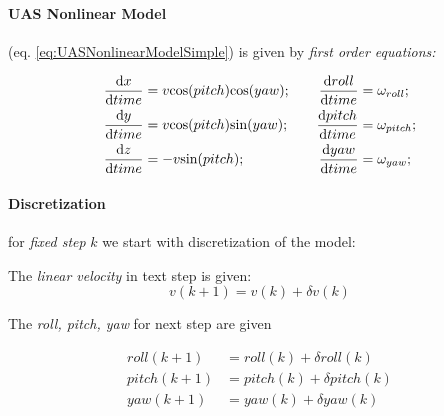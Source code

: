 \paragraph{UAS Nonlinear Model} (eq. \ref{eq:UASNonlinearModelSimple}) is given by \emph{first order equations:}

\begin{equation}\label{eq:UASNonlinearModelSimple}
    \begin{aligned}
        \frac{\text{d} x}{\text{d} time} &= v\cos(pitch)\cos(yaw);\\
        \frac{\text{d} y}{\text{d} time} &= v\cos(pitch)\sin(yaw);\\
        \frac{\text{d} z}{\text{d} time} &= -v\sin(pitch);\\
    \end{aligned}\\\quad\quad
    \begin{aligned}
        \frac{\text{d} roll}{\text{d} time} &= \omega_{roll};\\
        \frac{\text{d} pitch}{\text{d} time} &= \omega_{pitch};\\
        \frac{\text{d} yaw}{\text{d} time} &= \omega_{yaw};\\
    \end{aligned}
\end{equation}

\paragraph{Discretization} for \emph{fixed step} $k$ we start with discretization of the model:

\noindent The \emph{linear velocity} in text step is given:
\begin{equation}\label{eq:applyMovement}
    v(k+1) = v(k) +\delta v(k)
\end{equation}

\noindent The \emph{roll, pitch, yaw} for next step are given 

\begin{equation}\label{eq:applyMovement1}
    \begin{aligned}
        roll(k+1)  &= roll(k) + \delta roll(k)\\
        pitch(k+1) & = pitch(k) + \delta pitch(k)\\
        yaw(k+1) & = yaw(k) + \delta yaw(k)\\
    \end{aligned}    
\end{equation}

